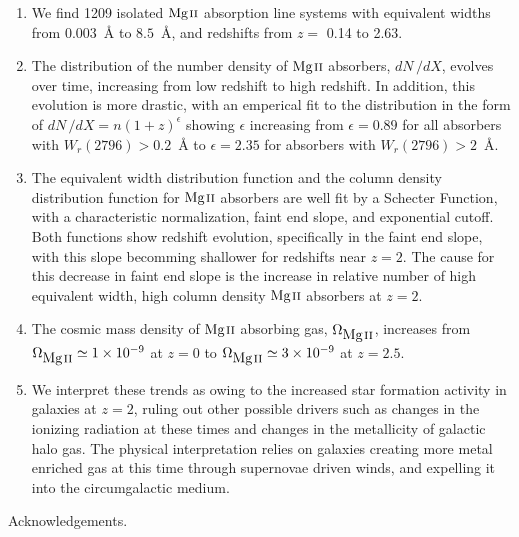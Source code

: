 \documentclass[iop,apj,numberedappendix,appendixfloats,twocolappendix]{emulateapj}
\begin{document}
\begin{enumerate}
\item We find 1209 isolated ${\hbox{{\rm Mg}\kern 0.1em{\sc ii}}}$ absorption line systems with equivalent widths from $0.003$~{\AA} to $8.5$~{\AA}, and redshifts from $z =$ 0.14 to 2.63. 
\item The distribution of the number density of ${\hbox{{\rm Mg}\kern 0.1em{\sc ii}}}$ absorbers, $dN\,/dX$, evolves over time, increasing from low redshift to high redshift. In addition, this evolution is more drastic, with an emperical fit to the distribution in the form of $dN\,/dX = n(1 + z)^{\epsilon}$ showing $\epsilon$ increasing from $\epsilon=0.89$ for all absorbers with $W_r(2796) > 0.2$~{\AA} to $\epsilon=2.35$ for absorbers with $W_r(2796) > 2$~{\AA}. 
\item The equivalent width distribution function and the column density distribution function for ${\hbox{{\rm Mg}\kern 0.1em{\sc ii}}}$ absorbers are well fit by a Schecter Function, with a characteristic normalization, faint end slope, and exponential cutoff. Both functions show redshift evolution, specifically in the faint end slope, with this slope becomming shallower for redshifts near $z = 2$. The cause for this decrease in faint end slope is the increase in relative number of high equivalent width, high column density ${\hbox{{\rm Mg}\kern 0.1em{\sc ii}}}$ absorbers at $z = 2$. 
\item The cosmic mass density of ${\hbox{{\rm Mg}\kern 0.1em{\sc ii}}}$ absorbing gas, $\Omega_{\hbox{{\rm Mg}\kern 0.1em{\sc ii}}}$, increases from $\Omega_{\hbox{{\rm Mg}\kern 0.1em{\sc ii}}} \simeq 1\times10^{-9}$ at $z = 0$ to $\Omega_{\hbox{{\rm Mg}\kern 0.1em{\sc ii}}} \simeq 3\times10^{-9}$ at $z = 2.5$.
\item We interpret these trends as owing to the increased star formation activity in galaxies at $z = 2$, ruling out other possible drivers such as changes in the ionizing radiation at these times and changes in the metallicity of galactic halo gas. The physical interpretation relies on galaxies creating more metal enriched gas at this time through supernovae driven winds, and expelling it into the circumgalactic medium. 
\end{enumerate}

Acknowledgements.



\end{document}
